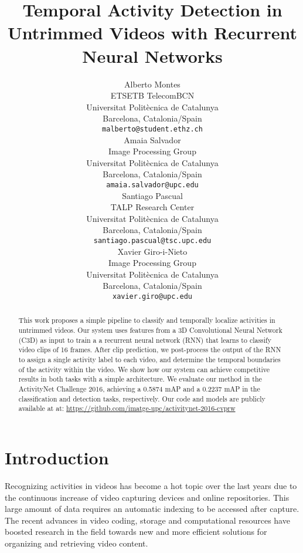 \documentclass{article}
\title{Temporal Activity Detection in Untrimmed Videos with Recurrent Neural Networks}
\author{
    Alberto Montes \\
    ETSETB TelecomBCN\\
    Universitat Politècnica de Catalunya \\
    Barcelona, Catalonia/Spain \\
    \texttt{malberto@student.ethz.ch} \\
    \And
    Amaia Salvador \\
    Image Processing Group \\
    Universitat Politècnica de Catalunya \\
    Barcelona, Catalonia/Spain \\
    \texttt{amaia.salvador@upc.edu} \\
    \And
    Santiago Pascual \\
    TALP Research Center \\
    Universitat Politècnica de Catalunya \\
    Barcelona, Catalonia/Spain \\
    \texttt{santiago.pascual@tsc.upc.edu} \\
    \And
    Xavier Giro-i-Nieto \\
    Image Processing Group \\
    Universitat Politècnica de Catalunya \\
    Barcelona, Catalonia/Spain \\
    \texttt{xavier.giro@upc.edu} \\
}
\begin{document}

\maketitle

\begin{abstract}


    This work proposes a simple pipeline to classify and temporally localize activities in untrimmed videos. Our system uses features from a 3D Convolutional Neural Network (C3D) as input to train a a recurrent neural network (RNN) that learns to classify video clips of 16 frames. After clip prediction, we post-process the output of the RNN to assign a single activity label to each video, and determine the temporal boundaries of the activity within the video. We show how our system can achieve competitive results in both tasks with a simple architecture. We evaluate our method in the ActivityNet Challenge 2016, achieving a 0.5874 mAP and a 0.2237 mAP in the classification and detection tasks, respectively. Our code and models are publicly available at at: \url{https://github.com/imatge-upc/activitynet-2016-cvprw}

\end{abstract}

\section{Introduction}

Recognizing activities in videos has become a hot topic over the last years due to the continuous increase of video capturing devices and online repositories.
This large amount of data requires an automatic indexing to be accessed after capture.
The recent advances in video coding, storage and computational resources have boosted research in the field towards new and more efficient solutions for organizing and retrieving video content.
\end{document}
